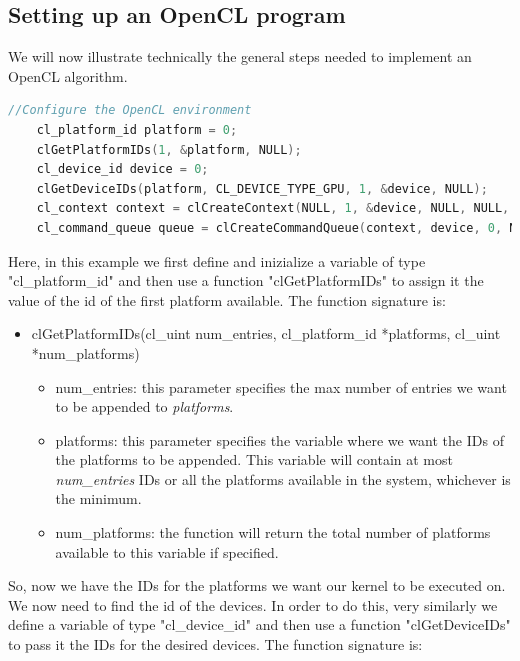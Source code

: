 \documentclass[titlepage]{article}
\begin{document}
\subsection{Setting up an OpenCL program}
We will now illustrate technically the general steps needed to implement an OpenCL algorithm.

\begin{minipage}{\linewidth}
\begin{lstlisting}[language=C, style=customc, breaklines=true]
    //Configure the OpenCL environment
    cl_platform_id platform = 0;
    clGetPlatformIDs(1, &platform, NULL);
    cl_device_id device = 0;
    clGetDeviceIDs(platform, CL_DEVICE_TYPE_GPU, 1, &device, NULL);
    cl_context context = clCreateContext(NULL, 1, &device, NULL, NULL, NULL);
    cl_command_queue queue = clCreateCommandQueue(context, device, 0, NULL);
\end{lstlisting}
\end{minipage}

Here, in this example we first define and inizialize a variable of type \newline "cl\_platform\_id" and then use a function "clGetPlatformIDs" to assign it the value of the id of the first platform available. The function signature is:
\begin{itemize}
    \item clGetPlatformIDs(cl\_uint num\_entries, cl\_platform\_id *platforms, cl\_uint *num\_platforms)
    \begin{itemize}
        \item num\_entries: this parameter specifies the max number of entries we want to be appended to \textit{platforms}.
        \item platforms: this parameter specifies the variable where we want the IDs of the platforms to be appended. This variable will contain at most \textit{num\_entries} IDs or all the platforms available in the system, whichever is the minimum.
        \item num\_platforms: the function will return the total number of platforms available to this variable if specified.
    \end{itemize}
\end{itemize}

So, now we have the IDs for the platforms we want our kernel to be executed on. We now need to find the id of the devices. In order to do this, very similarly we define a  variable of type "cl\_device\_id" and then use a function "clGetDeviceIDs" to pass it the IDs for the desired devices. The function signature is:
\end{document}
